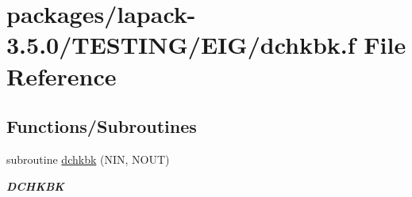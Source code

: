 \hypertarget{dchkbk_8f}{}\section{packages/lapack-\/3.5.0/\+T\+E\+S\+T\+I\+N\+G/\+E\+I\+G/dchkbk.f File Reference}
\label{dchkbk_8f}
\subsection*{Functions/\+Subroutines}
\begin{DoxyCompactItemize}
\item 
subroutine \hyperlink{group__double__eig_ga8bcf76f5f33d2f4905f61284d938d3e4}{dchkbk} (N\+I\+N, N\+O\+U\+T)
\begin{DoxyCompactList}\small\item\em {\bfseries D\+C\+H\+K\+B\+K} \end{DoxyCompactList}\end{DoxyCompactItemize}

